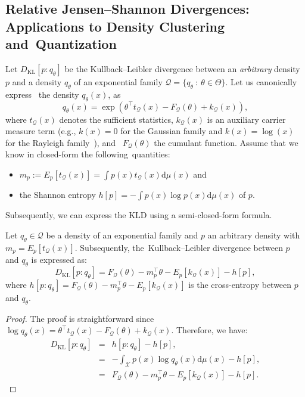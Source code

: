 \documentclass[entropy,article,accept,oneauthor,pdftex,entropy]{Definitions/mdpi}
\def\calQ{\mathcal{Q}}
\def\KL{\mathrm{KL}}
\def\dmu{\mathrm{d}\mu}
\def\calQ{\mathcal{Q}}
\def\calX{\mathcal{X}}
\def\dmu{\mathrm{d}\mu}
\begin{document}
\begin{paracol}{2}
\switchcolumn

\vspace{-12pt}


\subsection{Relative Jensen--Shannon Divergences: Applications to Density Clustering and~Quantization}
\label{sec:relJSD}\label{sec:clustering}

Let $D_\KL[p:q_\theta]$ be the Kullback--Leibler divergence between an {\em arbitrary} density $p$ and a density $q_\theta$ of an exponential family $\calQ=\{q_\theta\ :\ \theta\in\Theta\}$. 
Let us canonically express~\cite{EF-2009,EF-2014} the density $q_\theta(x)$, as~
$$
q_\theta(x)=\exp\left(\theta^\top t_\calQ(x)-F_\calQ(\theta)+k_\calQ(x)\right),
$$ 
where $t_\calQ(x)$ denotes the sufficient statistics, $k_\calQ(x)$ is an auxiliary carrier measure term (e.g., $k(x)=0$ for the Gaussian family 
and $k(x)=\log(x)$ for the Rayleigh family~\cite{EF-2009}),  and~
$F_\calQ(\theta)$ the cumulant function.
Assume that we   know in closed-form the following~quantities:
\begin{itemize}
\item $m_p:=E_p[t_\calQ(x)]=\int p(x)t_\calQ(x) \dmu(x)$ and 
\item the Shannon entropy $h[p]=-\int p(x)\log p(x) \dmu(x)$ of $p$.
\end{itemize}
Subsequently, we can express the KLD using a semi-closed-form formula.

\begin{Proposition}\label{eq:kldmef}
Let $q_\theta\in\calQ$ be a density of an exponential family 
and $p$ an arbitrary density with $m_p=E_p[t_\calQ(x)]$.
Subsequently, the~Kullback--Leibler divergence between $p$ and $q_\theta$ is expressed  as:
\begin{equation}\label{eq:scfef}
D_\KL[p:q_\theta] = F_\calQ(\theta)-m_p^\top\theta-E_p[k_\calQ(x)]-h[p],
\end{equation}
where $h[p:q_\theta]=F_\calQ(\theta)-m_p^\top\theta-E_p[k_\calQ(x)]$ is the cross-entropy between $p$ and $q_\theta$.
\end{Proposition}

\begin{proof}
The proof is straightforward since $\log q_\theta(x)=\theta^\top t_\calQ(x)-F_\calQ(\theta)+k_\calQ(x)$.
Therefore, we have:
\begin{eqnarray}
D_\KL[p:q_\theta] &=& h[p:q_\theta]-h[p],\\
&=&-\int_\calX p(x)\log q_\theta(x) \dmu(x) - h[p],\\
&=& F_\calQ(\theta)-m_p^\top\theta-E_p[k_\calQ(x)]-h[p]. 
\end{eqnarray}
\end{proof}


\end{paracol}
\end{document}
